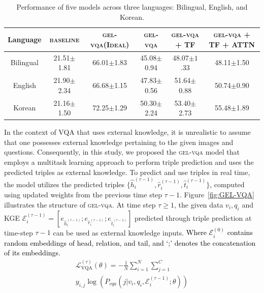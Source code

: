 \documentclass[letterpaper]{article} %
\newcommand{\kt}[1]{\textcolor{black}{#1}}
\begin{document}
\begin{table}[h]
\centering
\small
\begin{tabular}{cccccc}
\toprule
Language      & \textsc{baseline} & \textsc{gel-vqa(Ideal)}        & \textsc{gel-vqa}       & \textsc{gel-vqa} + TF & \textsc{gel-vqa} + TF + ATTN   \\
\midrule
Bilingual     &21.51$\pm$1.81     &66.01$\pm$1.83                  &45.08$\pm$0.94          &48.07$\pm1$.33         &48.11$\pm$1.50   \\
English       &21.90$\pm$2.34     &66.68$\pm$1.15                  &47.83$\pm$0.56          &51.64$\pm$0.88         &50.74$\pm$0.90 \\
Korean        &21.16$\pm$1.50     &72.25$\pm$1.29                  &50.30$\pm$2.24          &53.40$\pm$2.73         &55.48$\pm$1.89   \\

\bottomrule
\end{tabular}
\caption{Performance of five models across three languages: Bilingual, English, and Korean.}
\label{tab:table1}
\end{table}


In the context of VQA that uses external knowledge, it is unrealistic to assume that one possesses external knowledge pertaining to the given images and questions. Consequently, in this study, we proposed the \textsc{gel-vqa} model that employs a multitask learning approach to perform triple prediction and uses the predicted triples as external knowledge. To predict and use triples in real time, the model utilizes the predicted triples $\{\hat{h}_i^{(\tau-1)}, \hat{r}_i^{(\tau-1)}, \hat{t}_i^{(\tau-1)}\}$, computed using updated weights from the previous time step $\tau -1$.
Figure~\ref{fig:GEL-VQA} illustrates the structure of \textsc{gel-vqa}. At time step $\tau \ge 1$, the given data $v_i, q_i$ and KGE $\mathcal{E}^{(\tau-1)}_i = [e_{\hat{h}^{(\tau-1)}_i}; e_{\hat{r}^{(\tau-1)}_i}; e_{\hat{t}^{(\tau-1)}_i}]$ predicted through triple prediction at time-step $\tau-1$ can be used as external knowledge inputs. \kt{Where $\mathcal{E}^{(0)}_i$ contains random embeddings of head, relation, and tail, and `;' denotes the concatenation of its embeddings.}
\begin{multline} \label{gel-vqa-loss}
\mathcal{L}_{\mathrm{VQA}}^{(\tau)}(\theta) =  - \frac{1}{N} \sum_{i=1}^{N}\sum_{j=1}^{C}\\
y_{i, j} \log(P_{vqa}(j | v_i, q_i, \mathcal{E}^{(\tau-1)}_i; \theta))
\end{multline}
\end{document}
